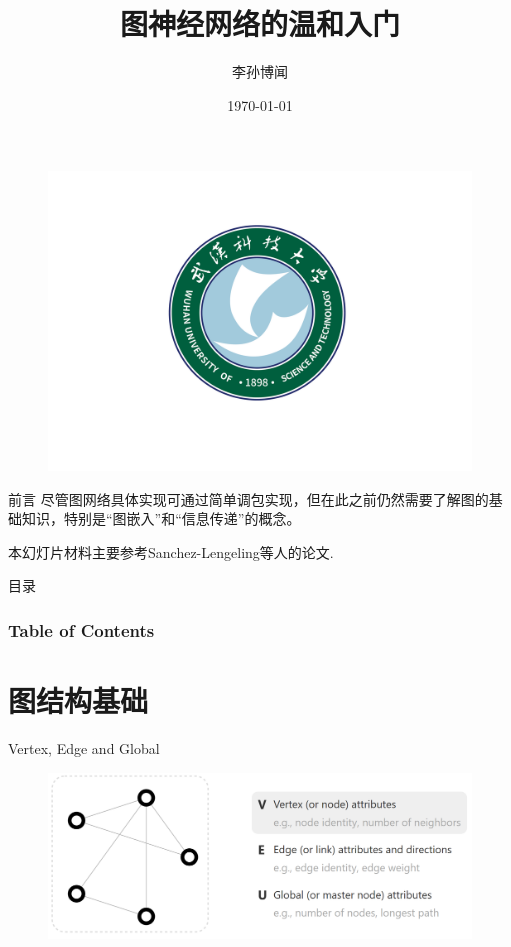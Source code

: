 \documentclass{beamer}
\author[Sunbowen Lee]{李孙博闻}
\title[Graph neural network]{图神经网络的温和入门}
\institute{武汉科技大学 \\ 理学院 \\ 冶金工业过程系统科学湖北省重点实验室}
\date{\today}
\begin{document}
\kaishu
\begin{frame}  %
    \titlepage
    \begin{figure}[htpb]
        \centering
        \vspace{-0.7cm}
        \includegraphics[width=0.45\linewidth]{wust.png}
    \end{figure}
\end{frame}

\begin{frame}{前言}
    尽管图网络具体实现可通过简单调包实现，但在此之前仍然需要了解图的基础知识，特别是``图嵌入''和``信息传递''的概念。\newline

    本幻灯片材料主要参考Sanchez-Lengeling\cite{sanchez-lengeling2021a}等人的论文.
\end{frame}

\begin{frame}{目录}
    \frametitle{Table of Contents}
    \tableofcontents
\end{frame}


\section{图结构基础}


\begin{frame}{Vertex, Edge and Global}
    \begin{figure}
        \includegraphics[width=\textwidth]{vertex.png}
    \end{figure}
\end{frame}
\end{document}
